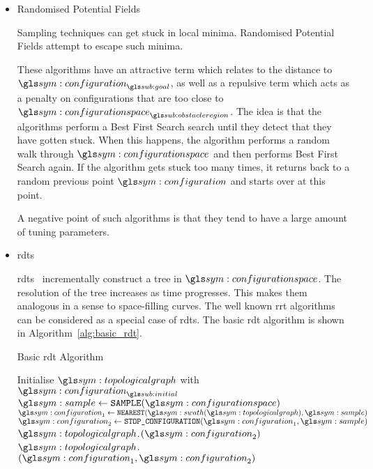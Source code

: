 \begin{itemize}


					\item Randomised Potential Fields

						Sampling techniques can get stuck in local minima.
						Randomised Potential Fields attempt to escape such
						minima.

						These algorithms have an attractive term which relates
						to the distance to $\configuration_{\goal}$, as well as
						a repulsive term which acts as a penalty on
						configurations that are too close to
						$\configurationspace_{\obstacleregion}$. The idea is
						that the algorithms perform a Best First Search search
						until they detect that they have gotten stuck. When this
						happens, the algorithm performs a random walk through
						$\configurationspace$ and  then performs Best First
						Search again. If the algorithm gets stuck too many
						times, it returns back to a random previous point
						$\configuration$ and starts over at this point.

						A negative point of such algorithms is that they tend to
						have a large amount of tuning parameters.

					\item \glspl{rdt}

						\glspl{rdt}~\cite{bib:planning:rapidly-exploring_random_trees_a_new_tool_for_path_planning}
						incrementally construct a tree in $\configurationspace$.
						The resolution of the tree increases as time progresses.
						This makes them analogous in a sense to space-filling
						curves. The well known \gls{rrt} algorithms can be
						considered as a special case of \glspl{rdt}. The basic
						\gls{rdt} algorithm is shown in
						Algorithm~\ref{alg:basic_rdt}.

						\begin{algorithm}[ht]
							\caption{Basic \gls{rdt} Algorithm}%
							\label{alg:basic_rdt}
							\begin{algorithmic}[1]
									\State{} Initialise $\topologicalgraph$ with $\configuration_{\initial}$
										\State{} $\sample \gets \code{SAMPLE}(\configurationspace)$ 								\label{alg:basic_rdt:sample}%
										\State{} $\configuration_1 \gets \code{NEAREST}(\swath(\topologicalgraph),\sample)$ 		\label{alg:basic_rdt:nearest}%
										\State{} $\configuration_2 \gets \code{STOP\_CONFIGURATION}(\configuration_1, \sample)$ 	\label{alg:basic_rdt:stop}%
											\State{} $\topologicalgraph$.$(\configuration_2)$ 					\label{alg:basic_rdt:add_vertex}%
											\State{} $\topologicalgraph$.$(\configuration_1, \configuration_2)$ 	\label{alg:basic_rdt:add_edge}%
										\EndIf{}
									\EndWhile{}
								\EndProcedure{}
							\end{algorithmic}
						\end{algorithm}


\end{itemize}
